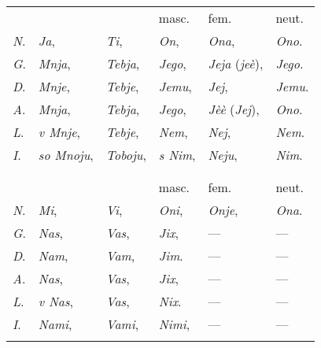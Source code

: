 \begin{longtable}{ l l l l l l }
    \lsptoprule
    \multicolumn{6}{ c }{Singular.} \\
    \midrule
    & & & masc. & fem. & neut. \\
    \textit{N}. & \textit{Ja}, & \textit{Ti}, & \textit{On}, & \textit{Ona}, & \textit{Ono}. \\
    \textit{G}. & \textit{Mnja}, & \textit{Tebja}, & \textit{Jego}, & \textit{Jeja} (\textit{jeè}), & \textit{Jego}. \\
    \textit{D}. & \textit{Mnje}, & \textit{Tebje}, & \textit{Jemu}, & \textit{Jej}, & \textit{Jemu}. \\
    \textit{A}. & \textit{Mnja}, & \textit{Tebja}, & \textit{Jego}, & \textit{Jèè} (\textit{Jej}), & \textit{Ono}. \\
    \textit{L}. & \textit{v Mnje}, & \textit{Tebje}, & \textit{Nem}, & \textit{Nej}, & \textit{Nem}. \\
    \textit{I}. & \textit{so Mnoju}, & \textit{Toboju}, & \textit{s Nim}, & \textit{Neju}, & \textit{Nim}. \\
    \lspbottomrule
    \\
    \lsptoprule
    \multicolumn{6}{ c }{Plural.} \\
    \midrule
    & & & masc. & fem. & neut. \\
    \textit{N}. & \textit{Mi}, & \textit{Vi}, & \textit{Oni}, & \textit{Onje}, & \textit{Ona}. \\
    \textit{G}. & \textit{Nas}, & \textit{Vas}, & \textit{Jix}, & — & — \\
    \textit{D}. & \textit{Nam}, & \textit{Vam}, & \textit{Jim}. & — & — \\
    \textit{A}. & \textit{Nas}, & \textit{Vas}, & \textit{Jix}, & — & — \\
    \textit{L}. & \textit{v Nas}, & \textit{Vas}, & \textit{Nix}. & — & — \\
    \textit{I}. & \textit{Nami}, & \textit{Vami}, & \textit{Nimi}, & — & — \\
    \lspbottomrule
\end{longtable}

